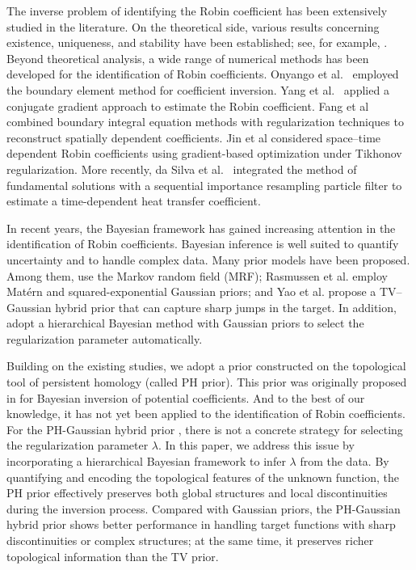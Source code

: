 \documentclass{ws-mplb}
\begin{document}
The inverse problem of identifying the Robin coefficient has been extensively studied in the literature.
On the theoretical side, various results concerning existence, uniqueness, and stability have been established; see, for example, \cite{Bellassoued2008, Biegert2009, Choulli1999, Jin2012, Shidfar2006, Slodicka2002, Slodicka2010}.
Beyond theoretical analysis, a wide range of numerical methods has been developed for the identification of Robin coefficients. Onyango et al.~\cite{Onyango2009} employed the boundary element method for coefficient inversion. Yang et al.~\cite{Yang2009} applied a conjugate gradient approach to estimate the Robin coefficient. Fang et al~\cite{Fang2009} combined boundary integral equation methods with regularization techniques to reconstruct spatially dependent coefficients. Jin et al \cite{Jin2012} considered space--time dependent Robin coefficients using gradient-based optimization under Tikhonov regularization. More recently, da Silva et al.~\cite{daSilva2021} integrated the method of fundamental solutions with a sequential importance resampling particle filter to estimate a time-dependent heat transfer coefficient.

In recent years, the Bayesian framework has gained increasing attention in the identification of Robin coefficients. Bayesian inference is well suited to quantify uncertainty and to handle complex data. Many prior models have been proposed. Among them, \cite{Jin2008, Jin2008withZou, Shi2023, Yan2009} use the Markov random field (MRF);  Rasmussen et al. \cite{Rasmussen2024} employ Matérn and squared-exponential Gaussian priors; and Yao et al.\cite{Yao2016} propose a TV–Gaussian hybrid prior that can capture sharp jumps in the target. In addition, \cite{Jin2008,  Shi2023, Yan2009} adopt a hierarchical Bayesian method with Gaussian priors to select the regularization parameter automatically.


Building on the existing studies, we adopt a prior constructed on the topological tool of persistent homology (called PH prior). This prior was originally proposed in \cite{Deng2025} for Bayesian inversion of potential coefficients. And to the best of our knowledge, it has not yet been applied to the identification of Robin coefficients.  For the PH-Gaussian hybrid prior \cite{Deng2025}, there is not a concrete strategy for selecting the regularization parameter $\lambda$.   In this paper, we address this issue by incorporating a hierarchical Bayesian framework to infer $\lambda$ from the data. By quantifying and encoding the topological features of the unknown function, the PH prior effectively preserves both global structures and local discontinuities during the inversion process. Compared with Gaussian priors, the PH-Gaussian hybrid prior shows better performance in handling target functions with sharp discontinuities or complex structures; at the same time, it preserves richer topological information than the TV prior.
\end{document}
